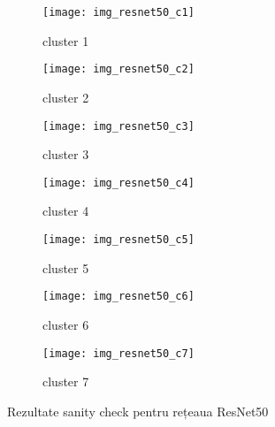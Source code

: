 \begin{figure}[!h]
  \centering
  \begin{subfigure}[t]{0.45\textwidth}
    \caption{cluster 1}
    \texttt{[image: img\_resnet50\_c1]}
  \end{subfigure}
  \hfill
  \begin{subfigure}[t]{0.45\textwidth}
    \caption{cluster 2}
    \texttt{[image: img\_resnet50\_c2]}
  \end{subfigure}
   \hfill
  \begin{subfigure}[t]{0.45\textwidth}
    \caption{cluster 3}
    \texttt{[image: img\_resnet50\_c3]}
  \end{subfigure}
  \hfill
  \begin{subfigure}[t]{0.45\textwidth}
    \caption{cluster 4}
    \texttt{[image: img\_resnet50\_c4]}
  \end{subfigure}
  \hfill
  \begin{subfigure}[t]{0.45\textwidth}
    \caption{cluster 5}
    \texttt{[image: img\_resnet50\_c5]}
  \end{subfigure}
  \hfill
  \begin{subfigure}[t]{0.45\textwidth}
    \caption{cluster 6}
    \texttt{[image: img\_resnet50\_c6]}
  \end{subfigure}
    \hfill
  \begin{subfigure}[t]{0.45\textwidth}
    \caption{cluster 7}
    \texttt{[image: img\_resnet50\_c7]}
  \end{subfigure}
  \caption[Rezultate sanity check pentru rețeaua ResNet50]{Rezultate sanity check pentru rețeaua ResNet50}
\end{figure}

